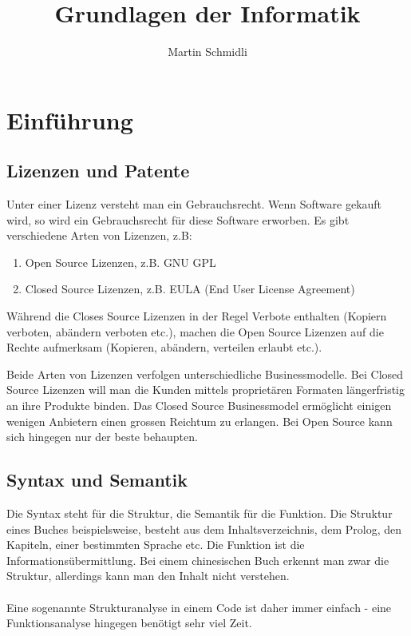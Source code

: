 \documentclass[a4paper,10pt]{report}
\begin{document}
\title{Grundlagen der Informatik}
\author{Martin Schmidli}
\maketitle


\tableofcontents %
\cleardoublepage %

\pagestyle{plain} %



\chapter{Einführung}
\section{Lizenzen und Patente}
Unter einer Lizenz versteht man ein Gebrauchsrecht. Wenn Software gekauft wird, so wird ein Gebrauchsrecht für diese Software erworben. Es gibt verschiedene Arten von Lizenzen, z.B:
\begin{enumerate}
\item Open Source Lizenzen, z.B. GNU GPL
\item Closed Source Lizenzen, z.B. EULA (End User License Agreement)
\end{enumerate}
Während die Closes Source Lizenzen in der Regel Verbote enthalten (Kopiern verboten, abändern verboten etc.), machen die Open Source Lizenzen auf die Rechte aufmerksam (Kopieren, abändern, verteilen erlaubt etc.).

Beide Arten von Lizenzen verfolgen unterschiedliche Businessmodelle. Bei Closed Source Lizenzen will man die Kunden mittels proprietären Formaten längerfristig an ihre Produkte binden. Das Closed Source Businessmodel ermöglicht einigen wenigen Anbietern einen grossen Reichtum zu erlangen. Bei Open Source kann sich hingegen nur der beste behaupten. 
\section{Syntax und Semantik}
Die Syntax steht für die Struktur, die Semantik für die Funktion.
Die Struktur eines Buches beispielsweise, besteht aus dem Inhaltsverzeichnis, dem Prolog, den Kapiteln, einer bestimmten Sprache etc. Die Funktion ist die Informationsübermittlung. Bei einem chinesischen Buch erkennt man zwar die Struktur, allerdings kann man den Inhalt nicht verstehen. \\ \\
Eine sogenannte Strukturanalyse in einem Code ist daher immer einfach - eine Funktionsanalyse hingegen benötigt sehr viel Zeit.
\end{document}
